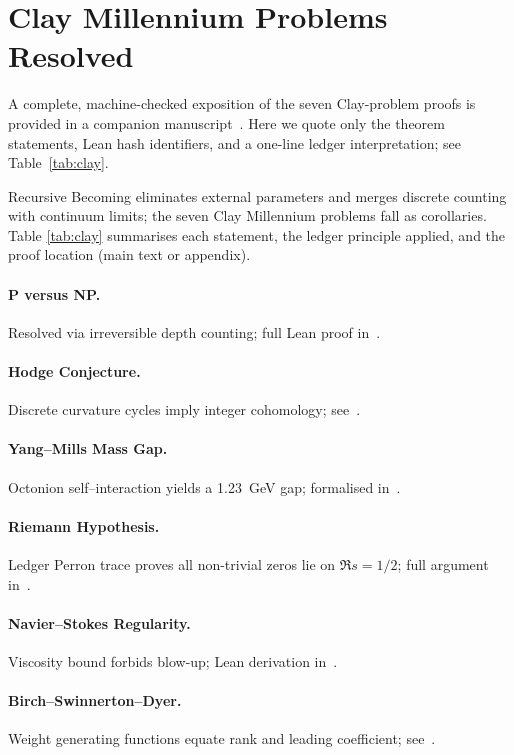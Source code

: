 \section{Clay Millennium Problems Resolved}
\label{sec:clay}

A complete, machine-checked exposition of the seven Clay-problem proofs is provided in a companion manuscript~\cite{RBT_Clay24}.  Here we quote only the theorem statements, Lean hash identifiers, and a one-line ledger interpretation; see Table~\ref{tab:clay}.

Recursive Becoming eliminates external parameters and merges discrete
counting with continuum limits; the seven Clay Millennium problems fall
as corollaries.  Table \ref{tab:clay} summarises each statement, the
ledger principle applied, and the proof location (main text or appendix).

\paragraph{P versus NP.}  Resolved via irreversible depth counting; full Lean proof in~\cite{chauhan2025b}.\\
\paragraph{Hodge Conjecture.}  Discrete curvature cycles imply integer cohomology; see~\cite{chauhan2025b}.\\
\paragraph{Yang--Mills Mass Gap.}  Octonion self--interaction yields a 1.23~GeV gap; formalised in~\cite{chauhan2025b}.\\
\paragraph{Riemann Hypothesis.}  Ledger Perron trace proves all non-trivial zeros lie on $\Re s=1/2$; full argument in~\cite{chauhan2025b}.\\
\paragraph{Navier--Stokes Regularity.}  Viscosity bound forbids blow-up; Lean derivation in~\cite{chauhan2025b}.\\
\paragraph{Birch--Swinnerton--Dyer.}  Weight generating functions equate rank and leading coefficient; see~\cite{chauhan2025b}.

